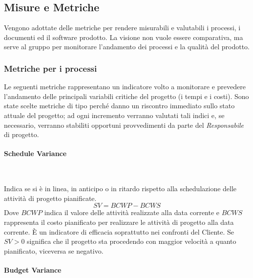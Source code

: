 		
	
	\subsection{Misure e Metriche}
	\label{MisureMetriche}
	
	Vengono adottate delle metriche per rendere misurabili e valutabili i processi, i documenti ed il software prodotto. La visione non vuole essere comparativa, ma serve al gruppo per monitorare l'andamento dei processi e la qualità del prodotto.
		
		\subsubsection{Metriche per i processi}
		\label{MetricheProcessi}
		Le seguenti metriche rappresentano un indicatore volto a monitorare e prevedere l'andamento delle principali variabili critiche del progetto (i tempi e i costi). Sono state scelte metriche di tipo  perché danno un riscontro immediato sullo stato attuale del progetto; ad ogni incremento verranno valutati tali indici e, se necessario, verranno stabiliti opportuni provvedimenti da parte del \emph{Responsabile} di progetto.
		
			\paragraph{Schedule Variance} \mbox{} \\
			\label{ScheduleVariance}\newline
			
			Indica se si è in linea, in anticipo o in ritardo rispetto alla schedulazione delle attività di progetto pianificate.
			\[
			SV = BCWP - BCWS
			\]
			Dove $BCWP$ indica il valore delle attività realizzate alla data corrente e $BCWS$ rappresenta il costo pianificato per realizzare le attività di progetto alla data corrente. 
			È un indicatore di efficacia soprattutto nei confronti del Cliente. Se $SV>0$ significa che il progetto sta procedendo con maggior velocità a quanto pianificato, viceversa se negativo.
			
			\paragraph{Budget Variance} \mbox{} \\
			
